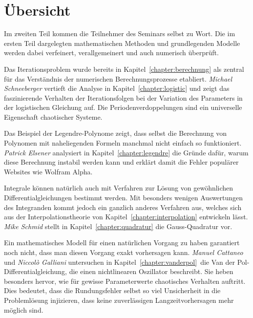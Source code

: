 %
%
%
\chapter*{Übersicht}
\rhead{}
\label{buch:uebersicht}
Im zweiten Teil kommen die Teilnehmer des Seminars selbst zu Wort.
Die im ersten Teil dargelegten mathematischen Methoden und
grundlegenden Modelle werden dabei verfeinert, verallgemeinert
und auch numerisch überprüft.

Das Iterationsproblem wurde bereits in Kapitel~\ref{chapter:berechnung}
als zentral für das Verständnis der numerischen Berechnungsprozesse
etabliert.
{\em Michael Schneeberger} vertieft die Analyse in
Kapitel~\ref{chapter:logistic}
und zeigt das faszinierende
Verhalten der Iterationsfolgen bei der Variation des Parameters in
der logistischen Gleichung auf.
%
%
Die Periodenverdoppelungen sind ein universelle Eigenschaft chaotischer
Systeme.
%
%

Das Beispiel der Legendre-Polynome zeigt, dass selbst die Berechnung
von Polynomen mit naheliegenden Formeln manchmal nicht einfach so 
funktioniert.
%
{\em Patrick Elsener} analysiert in Kapitel~\ref{chapter:legendre}
die Gründe dafür, warum diese 
Berechnung instabil werden kann und erklärt damit die Fehler 
populärer Websites wie Wolfram Alpha.
%
%
%

Integrale können natürlich auch mit Verfahren zur Lösung von
gewöhnlichen Differentialgleichungen bestimmt werden.
%
Mit besonders wenigen Auswertungen des Integranden kommt jedoch
ein ganzlich anderes Verfahren aus, welches sich aus der Interpolationstheorie
von Kapitel~\ref{chapter:interpolation} entwickeln lässt.
{\em Mike Schmid} stellt in Kapitel~\ref{chapter:quadratur} die
Gauss-Quadratur vor.
%
%

Ein mathematisches Modell für einen natürlichen Vorgang zu haben garantiert
noch nicht, dass man diesen Vorgang exakt vorhersagen kann.
{\em Manuel Cattaneo} und {\em Niccol\`o Galliani} untersuchen
in Kapitel~\ref{chapter:vanderpol} die
Van der Pol-Differentialgleichung, die einen nichtlinearen Oszillator
beschreibt.
%
%
Sie heben besonders hervor, wie für gewisse Parameterwerte chaotisches
Verhalten auftritt.
%
Dies bedeutet, dass die Rundungsfehler selbst so viel Unsicherheit in
die Problemlösung injizieren, dass keine zuverlässigen Langzeitvorhersagen 
mehr möglich sind.
%
%

